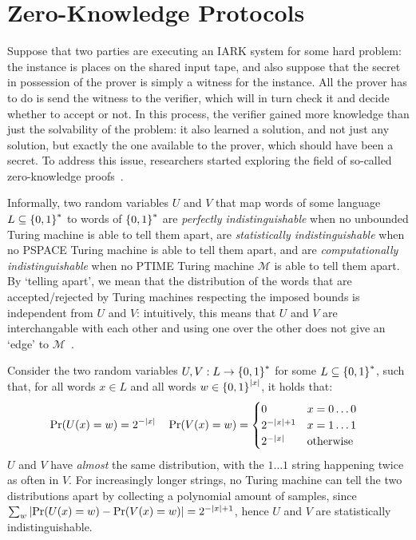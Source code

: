 \section{Zero-Knowledge Protocols}
Suppose that two parties are executing an IARK system for some hard problem: the instance is places 
on the shared input tape, and also suppose that the secret in possession of the prover is simply 
a witness for the instance. 
All the prover has to do is send the witness to the verifier, which will in turn check it and 
decide whether to accept or not.
In this process, the verifier gained more knowledge than just the solvability of the problem: it 
also learned a solution, and not just any solution, but exactly the one available to the prover,
which should have been a secret.
To address this issue, researchers started exploring the field of so-called zero-knowledge 
proofs~\cite{GoldwasserMR1989,GoldreichMW1991}.

Informally, two random variables \(U\) and \(V\) that map words of some language 
\(L \subseteq \left\{0, 1\right\}^{*}\) to words of \(\left\{0, 1\right\}^{*}\) are 
\emph{perfectly indistinguishable} when no unbounded Turing machine is able to tell them apart,
are \emph{statistically indistinguishable} when no \textsc{PSPACE} Turing machine is able to 
tell them apart, and are \emph{computationally indistinguishable} when no \textsc{PTIME} Turing 
machine \(\mathcal{M}\) is able to tell them apart.
By `telling apart', we mean that the distribution of the words that are accepted/rejected 
by Turing machines respecting the imposed bounds is independent from \(U\) and \(V\): intuitively,
this means that \(U\) and \(V\) are interchangable with each other and using one over the other 
does not give an `edge' to \(\mathcal{M}\)~\cite{GoldwasserM1984,GoldwasserMR1989,Yao1982}.
\begin{example}
  Consider the two random variables \(U, V: L \to \left\{0, 1\right\}^{*}\) for some 
  \(L \subseteq \left\{0, 1\right\}^{*}\), such that, for all words \(x \in L\) and all words 
  \(w \in \left\{0, 1\right\}^{\left\lvert x\right\rvert}\), it holds that:
  \begin{align*}
    & \call{\Pr}{\call{U}{x} = w} = 2^{-\abs{x}} &&
    \call{\Pr}{\call{V}{x} = w} = \begin{cases}
      0 & x = 0\dots0 \\
      2^{-\abs{x} + 1} & x = 1\dots1 \\
      2^{-\abs{x}} & \textrm{otherwise}
    \end{cases}
  \end{align*}
  \(U\) and \(V\) have \emph{almost} the same distribution, with the \(1\dots1\) string 
  happening twice as often in \(V\). 
  For increasingly longer strings, no Turing machine can tell the two distributions apart by 
  collecting a polynomial amount of samples, since 
  \(\sum_{w}{\abs{\call{\Pr}{\call{U}{x} = w} - \call{\Pr}{\call{V}{x} = w}}} = 2^{-\abs{x}+1}\),
  hence \(U\) and \(V\) are statistically indistinguishable.
\end{example}

